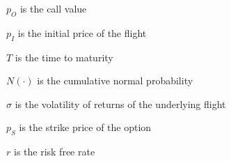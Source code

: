 \begin{compactdesc}
\item[$p_O$] is the call value
\item[$p_I$] is the initial price of the flight
\item[$T$] is the time to maturity
\item[$N(\cdot)$] is the cumulative normal probability
\item[$\sigma$] is the volatility of returns of the underlying flight
\item[$p_S$] is the strike price of the option
\item[$r$] is the risk free rate
\vspace{1ex}
\end{compactdesc}
